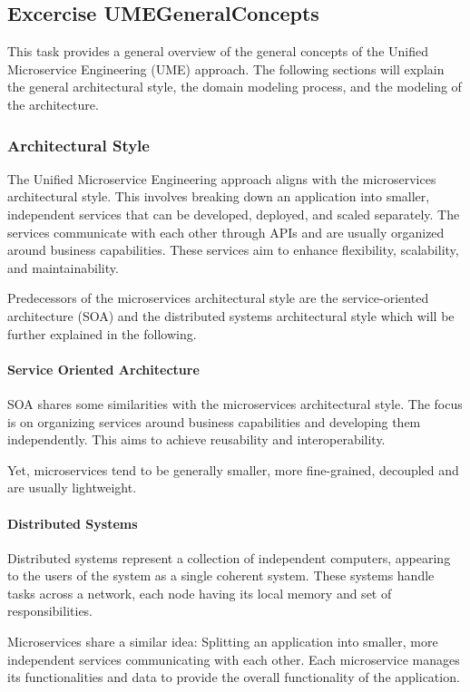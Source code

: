 \subsection{Excercise UMEGeneralConcepts}
\label{sec:ume_general_concepts}
This task provides a general overview of the general concepts of the Unified Microservice Engineering (UME) approach.
The following sections will explain the general architectural style, the domain modeling process, and the modeling of the architecture.

\subsubsection*{Architectural Style}
The Unified Microservice Engineering approach aligns with the microservices architectural style.
This involves breaking down an application into smaller, independent services that can be developed, deployed, and scaled separately.
The services communicate with each other through APIs and are usually organized around business capabilities.
These services aim to enhance flexibility, scalability, and maintainability.

Predecessors of the microservices architectural style are the service-oriented architecture (SOA) and the distributed systems architectural style which will be further explained in the following.

\paragraph*{Service Oriented Architecture}
SOA shares some similarities with the microservices architectural style.
The focus is on organizing services around business capabilities and developing them independently.
This aims to achieve reusability and interoperability.

Yet, microservices tend to be generally smaller, more fine-grained, decoupled and are usually lightweight.

\paragraph*{Distributed Systems}
Distributed systems represent a collection of independent computers, appearing to the users of the system as a single coherent system.
These systems handle tasks across a network, each node having its local memory and set of responsibilities.

Microservices share a similar idea: Splitting an application into smaller, more independent services communicating with each other.
Each microservice manages its functionalities and data to provide the overall functionality of the application.

